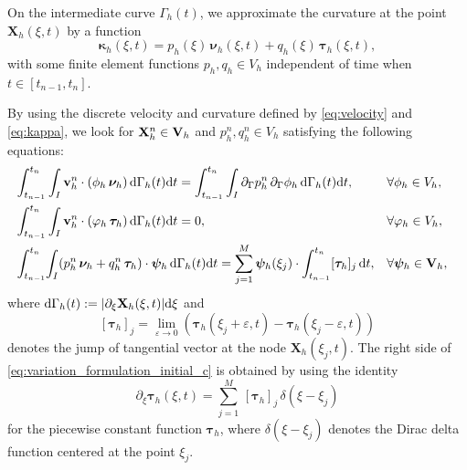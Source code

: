 \documentclass[review]{elsarticle}
\def\d{{\mathrm d}}
\begin{document}
On the intermediate curve $\Gamma_h(t)$, we approximate the curvature at the point $\mathbf{X}_h(\xi, t)$ by a function
\begin{equation}\label{eq:kappa}
    \boldsymbol\kappa_h(\xi, t) = p_h(\xi)\,\boldsymbol\nu_h(\xi, t) + q_h(\xi)\,\boldsymbol\tau_h(\xi, t),
\end{equation}
with some finite element functions $p_h, q_h\in V_h$ independent of time when $t\in [t_{n-1},t_n]$.


By using the discrete velocity and curvature defined by \eqref{eq:velocity} and \eqref{eq:kappa}, we look for $\mathbf{X}_h^n\in {\bf V}_h$ and $p_h^n, q_h^n\in V_h$ satisfying the following equations:
\begin{subequations}\label{eq:variation_formulation_initial}
\begin{align}
&\hspace{-10pt}  \int_{t_{n-1}}^{t_{n}}\int_{I} \mathbf{v}_h^n\cdot( \phi_h\, \boldsymbol\nu_h)\, \d\Gamma_h(t) \mathrm{d}t      =\int_{t_{n-1}}^{t_{n}}\int_{I}
\partial_\Gamma p_h^n\, \partial_\Gamma \phi_h\, \d\Gamma_h(t) \mathrm{d}t, && \forall \phi_h \in V_h, \label{eq:variation_formulation_initial_a}\\
&\hspace{-10pt}\int_{t_{n-1}}^{t_{n}}\int_{I} \mathbf{v}_h^n\cdot ( \varphi_h\,\boldsymbol\tau_h) \, \d\Gamma_h(t)\mathrm{d}t
= 0,
&& \forall \varphi_h\in V_h, \label{eq:variation_formulation_initial_b}\\
&\hspace{-10pt}     \int_{t_{n-1}}^{t_{n}} \hspace{-2pt}  \int_{I}  ( p_h^n\,\boldsymbol\nu_h +  q_h^n\, \boldsymbol\tau_h)\cdot \boldsymbol\psi_h \,\d\Gamma_h(t)\mathrm{d}t
= \sum_{j = 1}^M\boldsymbol\psi_h(\xi_j) \cdot  \int_{t_{n-1}}^{t_{n}}[\boldsymbol\tau_h]_j \,\mathrm{d}t,  && \forall\boldsymbol\psi_h\in {\bf V}_h, \label{eq:variation_formulation_initial_c}
\end{align}
\end{subequations}
where $\d\Gamma_h(t):=|\partial_\xi {\bf X}_h(\xi,t)|\d\xi$ and
$$
[\boldsymbol\tau_h]_j = \lim_{\varepsilon\to 0}\left(\boldsymbol\tau_h(\xi_j + \varepsilon, t) - \boldsymbol\tau_h(\xi_j - \varepsilon, t)\right)
$$ denotes the jump of tangential vector at the node $\mathbf{X}_h(\xi_j ,t)$. The right side of \eqref{eq:variation_formulation_initial_c} is obtained by using the identity
$$
\partial_\xi \boldsymbol \tau_h(\xi,t)
= \sum_{j=1}^M \, [\boldsymbol\tau_h]_j \, \delta(\xi-\xi_j)
$$
for the piecewise constant function $\boldsymbol \tau_h$,
where $\delta(\xi-\xi_j)$ denotes the Dirac delta function centered at the point $\xi_j$.
\end{document}
